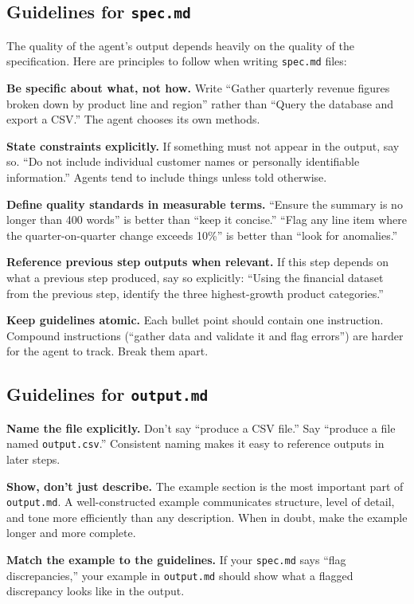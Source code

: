 \documentclass[12pt, a4paper]{article}
\begin{document}
\subsection{Guidelines for \texttt{spec.md}}

The quality of the agent's output depends heavily on the quality of the specification. Here are principles to follow when writing \texttt{spec.md} files:

\textbf{Be specific about what, not how.}
Write ``Gather quarterly revenue figures broken down by product line and region'' rather than ``Query the database and export a CSV.'' The agent chooses its own methods.

\textbf{State constraints explicitly.}
If something must not appear in the output, say so. ``Do not include individual customer names or personally identifiable information.'' Agents tend to include things unless told otherwise.

\textbf{Define quality standards in measurable terms.}
``Ensure the summary is no longer than 400 words'' is better than ``keep it concise.'' ``Flag any line item where the quarter-on-quarter change exceeds 10\%'' is better than ``look for anomalies.''

\textbf{Reference previous step outputs when relevant.}
If this step depends on what a previous step produced, say so explicitly: ``Using the financial dataset from the previous step, identify the three highest-growth product categories.''

\textbf{Keep guidelines atomic.}
Each bullet point should contain one instruction. Compound instructions (``gather data and validate it and flag errors'') are harder for the agent to track. Break them apart.

\subsection{Guidelines for \texttt{output.md}}

\textbf{Name the file explicitly.}
Don't say ``produce a CSV file.'' Say ``produce a file named \texttt{output.csv}.'' Consistent naming makes it easy to reference outputs in later steps.

\textbf{Show, don't just describe.}
The example section is the most important part of \texttt{output.md}. A well-constructed example communicates structure, level of detail, and tone more efficiently than any description. When in doubt, make the example longer and more complete.

\textbf{Match the example to the guidelines.}
If your \texttt{spec.md} says ``flag discrepancies,'' your example in \texttt{output.md} should show what a flagged discrepancy looks like in the output.
\end{document}
